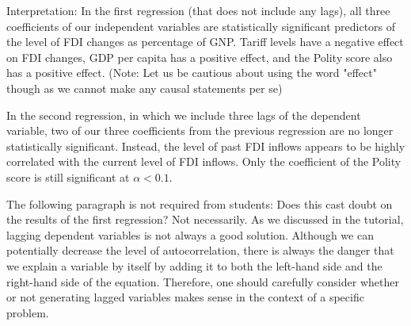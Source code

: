 \documentclass[12pt]{article}\usepackage[]{graphicx}\usepackage[]{color}
\begin{document}
Interpretation: In the first regression (that does not include any lags), all three coefficients of our independent variables are statistically significant predictors of the level of FDI changes as percentage of GNP. Tariff levels have a negative effect on FDI changes, GDP per capita has a positive effect, and the Polity score also has a positive effect. (Note: Let us be cautious about using the word "effect" though as we cannot make any causal statements per se)

In the second regression, in which we include three lags of the dependent variable, two of our three coefficients from the previous regression are no longer statistically significant. Instead, the level of past FDI inflows appears to be highly correlated with the current level of FDI inflows. Only the coefficient of the Polity score is still significant at $\alpha < 0.1$.

The following paragraph is not required from students: Does this cast doubt on the results of the first regression? Not necessarily. As we discussed in the tutorial, lagging dependent variables is not always a good solution. Although we can potentially decrease the level of autocorrelation, there is always the danger that we explain a variable by itself by adding it to both the left-hand side and the right-hand side of the equation. Therefore, one should carefully consider whether or not generating lagged variables makes sense in the context of a specific problem.
\end{document}
